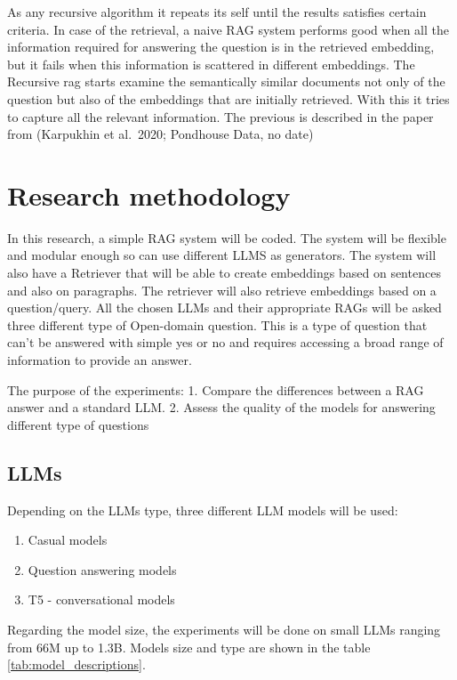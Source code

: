 \documentclass{wseas}
\begin{document}
As any recursive algorithm it repeats its self until the results
satisfies certain criteria. In case of the retrieval, a naive RAG system
performs good when all the information required for answering the
question is in the retrieved embedding, but it fails when this
information is scattered in different embeddings. The Recursive rag
starts examine the semantically similar documents not only of the
question but also of the embeddings that are initially retrieved. With
this it tries to capture all the relevant information. The previous is
described in the paper from (Karpukhin et al.~2020; Pondhouse Data, no
date) \cite{cite16} \cite{cite17}


\section{Research methodology}

In this research, a simple RAG system will be coded. The system will be
flexible and modular enough so can use different LLMS as generators. The
system will also have a Retriever that will be able to create embeddings
based on sentences and also on paragraphs. The retriever will also
retrieve embeddings based on a question/query. All the chosen LLMs and
their appropriate RAGs will be asked three different type of Open-domain
question. This is a type of question that can't be answered with simple
yes or no and requires accessing a broad range of information to provide
an answer.

The purpose of the experiments: 1. Compare the differences between a RAG
answer and a standard LLM. 2. Assess the quality of the models for
answering different type of questions

\subsection{LLMs}

Depending on the LLMs type, three different LLM models will be used:

\begin{enumerate}
\def\labelenumi{\arabic{enumi}.}
\item
  Casual models
\item
  Question answering models
\item
  T5 - conversational models
\end{enumerate}

Regarding the model size, the experiments will be done on small LLMs
ranging from 66M up to 1.3B. Models size and type are shown in the table \ref{tab:model_descriptions}.
\end{document}
